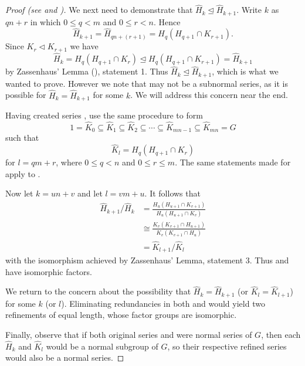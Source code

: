 \begin{proof}[Proof (see {\cite[\S 72]{clark_1984}} and \cite{proofwiki_schreierzassenhaus})]
    We next need to demonstrate that $\hat{H}_k \unlhd \hat{H}_{k+1}$. Write $k$ as $qn+r$ in which $0 \leq q < m$ and $0 \leq r < n$. Hence
    \[
        \hat{H}_{k+1} = \hat{H}_{qn+(r+1)} = H_q(H_{q+1}\cap K_{r+1}). 
    \]
    Since $K_r \lhd K_{r+1}$ we have
    \[
        \hat{H}_k = H_q(H_{q+1}\cap K_r) \unlhd H_q(H_{q+1}\cap K_{r+1}) = \hat{H}_{k+1}
    \]
    by Zassenhaus' Lemma (), statement 1. Thus $\hat{H}_k \unlhd \hat{H}_{k+1}$, which is what we wanted to prove. However we note that  may not be a subnormal series, as it is possible for $\hat{H}_k = \hat{H}_{k+1}$ for some $k$. We will address this concern near the end.
    
    Having created series , use the same procedure to form
    \begin{equation}\label{eqn:thrm-schreier-eqn-b-prime}
        1 = \hat{K}_0 \subseteq \hat{K}_1 \subseteq \hat{K}_2 \subseteq \cdots \subseteq \hat{K}_{mn - 1} \subseteq \hat{K}_{mn} = G
        \tag{B'}
    \end{equation}
    such that
    \[
        \hat{K}_l = H_q(H_{q+1}\cap K_r)
    \]
    for $l = qm + r$, where $0 \leq q < n$ and $0 \leq r \leq m$. The same statements made for  apply to .
    
    Now let $k = un + v$ and let $l = vm + u$. It follows that
    \begin{align*}
        \hat{H}_{k+1}/\hat{H}_k &= \frac{H_u(H_{u+1}\cap K_{v+1})}{H_u(H_{u+1}\cap K_v)}\\
        &\cong \frac{K_v(K_{v+1}\cap H_{u+1})}{K_v(K_{v+1}\cap H_u)}\\
        &= \hat{K}_{l+1}/\hat{K}_l
    \end{align*}
    with the isomorphism achieved by Zassenhaus' Lemma, statement 3. Thus  and  have isomorphic factors.
    
    We return to the concern about the possibility that $\hat{H}_k = \hat{H}_{k+1}$ (or $\hat{K}_l = \hat{K}_{l+1}$) for some $k$ (or $l$). Eliminating redundancies in both  and  would yield two refinements of equal length, whose factor groups are isomorphic.
    
    Finally, observe that if both original series  and  were normal series of $G$, then each $\hat{H}_k$ and $\hat{K}_l$ would be a normal subgroup of $G$, so their respective refined series would also be a normal series.
\end{proof}

